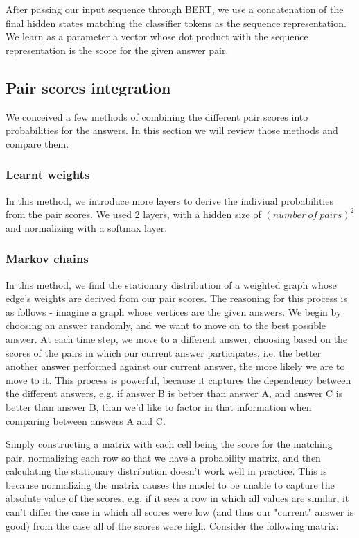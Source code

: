 \documentclass{article}
\begin{document}
After passing our input sequence through BERT, we use a concatenation of the final hidden states matching the classifier tokens as the sequence representation. We learn as a parameter a vector whose dot product with the sequence representation is the score for the given answer pair.

\subsection{Pair scores integration}

We conceived a few methods of combining the different pair scores into probabilities for the answers. In this section we will review those methods and compare them.

\subsubsection{Learnt weights}

In this method, we introduce more layers to derive the indiviual probabilities from the pair scores. We used 2 layers, with a hidden size of $ (number\ of\ pairs)^2 $ and normalizing with a softmax layer.

\subsubsection{Markov chains}

In this method, we find the stationary distribution of a weighted graph whose edge's weights are derived from our pair scores.
The reasoning for this process is as follows - imagine a graph whose vertices are the given answers. We begin by choosing an answer randomly, and we want to move on to the best possible answer. At each time step, we move to a different answer, choosing based on the scores of the pairs in which our current answer participates, i.e. the better another answer performed against our current answer, the more likely we are to move to it.
This process is powerful, because it captures the dependency between the different answers, e.g. if answer B is better than answer A, and answer C is better than answer B, than we'd like to factor in that information when comparing between answers A and C.


Simply constructing a matrix with each cell being the score for the matching pair, normalizing each row so that we have a probability matrix, and then calculating the stationary distribution doesn't work well in practice. This is because normalizing the matrix causes the model to be unable to capture the absolute value of the scores, e.g. if it sees a row in which all values are similar, it can't differ the case in which all scores were low (and thus our "current" answer is good) from the case all of the scores were high.
Consider the following matrix:
\end{document}
